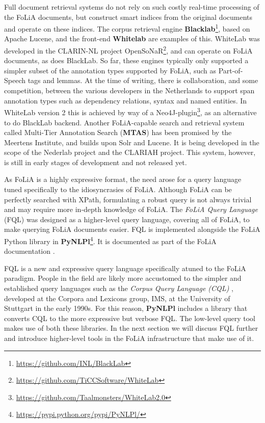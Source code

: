 \documentclass[a4paper,11pt]{article}
\begin{document}
Full document retrieval systems do not rely on such costly real-time processing
of the FoLiA documents, but construct smart indices from the original documents
and operate on these indices. The corpus retrieval engine
\textbf{Blacklab}\footnote{\url{https://github.com/INL/BlackLab}}, based on
Apache Lucene, and the front-end \textbf{Whitelab}
\cite{ReynaertVandecampVanzaanen2014ColingDemo} are examples of this. WhiteLab
was developed in the CLARIN-NL project
OpenSoNaR\footnote{\url{https://github.com/TiCCSoftware/WhiteLab}}, and can
operate on FoLiA documents, as does BlackLab. So far, these engines typically
only supported a simpler subset of the annotation types supported by FoLiA,
such as Part-of-Speech tags and lemmas.  At the time of writing, there is
collaboration, and some competition, between the various developers in the
Netherlands to support span annotation types such as dependency relations,
syntax and named entities. In WhiteLab version 2 this is achieved by way of a
Neo4J-plugin\footnote{\url{https://github.com/Taalmonsters/WhiteLab2.0}}, as an
alternative to do BlackLab backend. Another FoLiA-capable search and retrieval
system called Multi-Tier Annotation Search (\textbf{MTAS}) has been promised by
the Meertens Institute, and builds upon Solr and Lucene. It is being developed in
the scope of the Nederlab project \cite{Nederlab2016} and the CLARIAH project.
This system, however, is still in early stages of development and not released
yet.


As FoLiA is a highly expressive format, the need arose for a query language
tuned specifically to the idiosyncrasies of FoLiA. Although FoLiA can be
perfectly searched with XPath, formulating a robust query is not always trivial
and may require more in-depth knowledge of FoLiA. The \emph{FoLiA Query
Language} (FQL) was designed as a higher-level query language, covering all of
FoLiA, to make querying FoLiA documents easier. FQL is implemented alongside
the FoLiA Python library in
\textbf{PyNLPl}\footnote{\url{https://pypi.python.org/pypi/PyNLPl/}}. It is documented as part
of the FoLiA documentation \cite{FOLIADOC2014}.

FQL is a new and expressive query language specifically atuned to the FoLiA
paradigm. People in the field are likely more accustomed to the simpler and
established query languages such as the \emph{Corpus Query Language (CQL)}
\cite{CWB-Christ94}, developed at the Corpora and Lexicons group, IMS, at the
University of Stuttgart in the early 1990s. For this reason, \textbf{PyNLPl}
includes a library that converts CQL to the more expressive but verbose FQL.
The low-level query tool makes use of both these libraries. In the next section
we will discuss FQL further and introduce higher-level tools in the FoLiA
infrastructure that make use of it.
\end{document}
